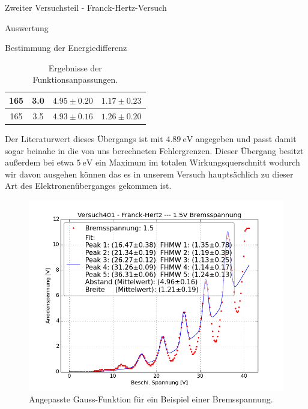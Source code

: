 \documentclass[pdftex, a4paper,11pt, twoside, ngerman]{report}
\begin{document}
\begin{chapter}{Zweiter Versuchsteil - Franck-Hertz-Versuch}
\begin{section}{Auswertung}
\begin{subsection}{Bestimmung der Energiedifferenz}
\begin{table}[htbp]
\begin{tabular}{|c|c|c|c|}
            165 & 3.0 & $4.95\pm 0.20$ & $1.17\pm 0.23$ \\ \hline
            165 & 3.5 & $4.93\pm 0.16$ & $1.26\pm 0.20$ \\ \hline
          \end{tabular}
          \caption{Ergebnisse der Funktionsanpassungen.}
          \label{tab:AbstandBreite}
        \end{table}
        \newline
        Der Literaturwert dieses Übergangs ist mit $\SI{4.89}{\electronvolt}$
        angegeben und passt damit sogar beinahe in die von uns berechneten
        Fehlergrenzen. Dieser Übergang besitzt außerdem bei etwa
        $\SI{5}{\electronvolt}$ ein Maximum im totalen Wirkungsquerschnitt
        wodurch wir davon ausgehen können das es in unserem Versuch
        hauptsächlich zu dieser Art des Elektronenüberganges gekommen ist.
        \begin{figure}[ht]
          \centering
          \begin{minipage}{0.48\textwidth}
            \centering
            \includegraphics[width=\textwidth]
                {Figures/Versuch401-Franck-Hertz-1_5VBremsspannung_Beschl_Spannung_Anodenspannung.png}
            \caption{Angepasste Gauss-Funktion für ein Beispiel einer
                Bremsspannung.}
            \label{fig:FHB15V}
          \end{minipage}\quad
          \begin{minipage}{0.48\textwidth}
            \centering

\end{minipage}
\end{figure}
\end{subsection}
\end{section}
\end{chapter}
\end{document}
